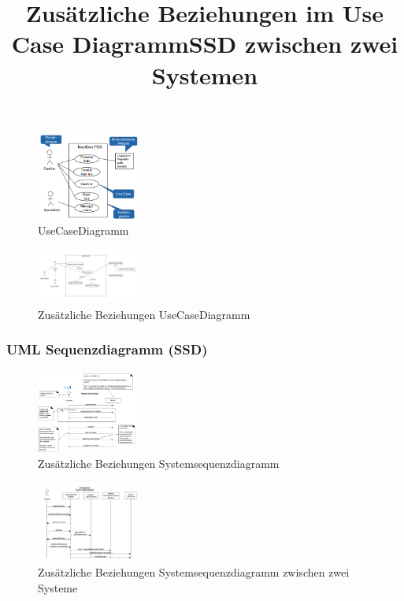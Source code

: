 \documentclass{article}
\begin{document}
\begin{figure}[H]
	\centering
	\includegraphics[width=0.3\textwidth] {Resources/Images/UseCaseDiagramm.png}
	\caption{\label{fig:UseCaseDiagramm}UseCaseDiagramm}
	\end{figure}


\title {Zusätzliche Beziehungen im Use Case Diagramm}

\begin{figure}[H]
	\centering
	\includegraphics[width=0.3\textwidth] {Resources/Images/UseCaseDiagramm2.png}
	\caption{\label{fig:UseCaseDiagramm2}Zusätzliche Beziehungen UseCaseDiagramm}
	\end{figure}


\subsubsection{UML Sequenzdiagramm (SSD)}


\begin{figure}[H]
	\centering
	\includegraphics[width=0.3\textwidth] {Resources/Images/Systemsequenzdiagramm.png}
	\caption{\label{fig:Systemsequenzdiagramm}Zusätzliche Beziehungen Systemsequenzdiagramm}
	\end{figure}
	
\title {SSD zwischen zwei Systemen}
\begin{figure}[H]
	\centering
	\includegraphics[width=0.3\textwidth] {Resources/Images/SSD2.png}
	\caption{\label{fig:SSD2}Zusätzliche Beziehungen Systemsequenzdiagramm zwischen zwei Systeme}
	\end{figure}
\end{document}
